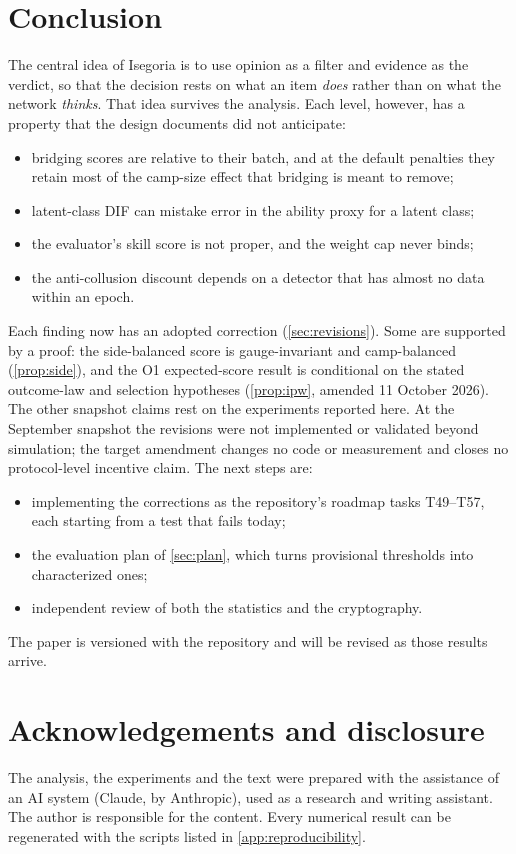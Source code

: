 \section{Conclusion}\label{sec:conclusion}

The central idea of Isegoria is to use opinion as a filter and evidence as the verdict, so that
the decision rests on what an item \emph{does} rather than on what the network \emph{thinks}. That
idea survives the analysis. Each level, however, has a property that the design documents did not
anticipate:
\begin{itemize}
  \item bridging scores are relative to their batch, and at the default penalties they retain most
    of the camp-size effect that bridging is meant to remove;
  \item latent-class DIF can mistake error in the ability proxy for a latent class;
  \item the evaluator's skill score is not proper, and the weight cap never binds;
  \item the anti-collusion discount depends on a detector that has almost no data within an epoch.
\end{itemize}
Each finding now has an adopted correction (\cref{sec:revisions}). Some are supported by a
proof: the side-balanced score is gauge-invariant and camp-balanced (\cref{prop:side}), and
the O1 expected-score result is conditional on the stated outcome-law and selection
hypotheses (\cref{prop:ipw}, amended 11 October 2026). The other snapshot claims rest on the
experiments reported here. At the September snapshot the revisions were not implemented or
validated beyond simulation; the target amendment changes no code or measurement and closes
no protocol-level incentive claim.
The next steps are:
\begin{itemize}
  \item implementing the corrections as the repository's roadmap tasks T49--T57, each starting
    from a test that fails today;
  \item the evaluation plan of \cref{sec:plan}, which turns provisional thresholds into
    characterized ones;
  \item independent review of both the statistics and the cryptography.
\end{itemize}
The paper is versioned with the repository and will be revised as those results arrive.

\section*{Acknowledgements and disclosure}
The analysis, the experiments and the text were prepared with the assistance of an AI system
(Claude, by Anthropic), used as a research and writing assistant. The author is responsible for
the content. Every numerical result can be regenerated with the scripts listed in
\cref{app:reproducibility}.
